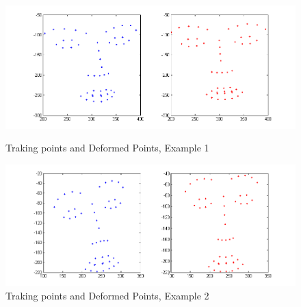 \begin{figure}[ht]
\centering
\includegraphics[width=150mm]{imgs/160954_Deform_213.png}
\caption{Traking points and Deformed Points, Example 1}
\label{fig:RHP01}
\includegraphics[width=150mm]{imgs/160954_Deform_233.png}
\caption{Traking points and Deformed Points, Example 2}
\label{fig:RHP02}
\end{figure}
\newpage
